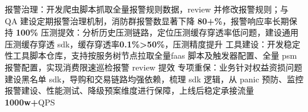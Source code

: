 \documentclass[11pt,a4paper]{moderncv}
\begin{document}
{\begin{itemize}
        \newline 报警治理：开发爬虫脚本抓取全量报警规则数据，review 并修改报警规则；与 QA 建设定期报警治理机制，消防群报警数显著下降 \textbf{80+\%}，报警响应率长期保持 \textbf{100\%}
        \newline 压测提效：分析历史压测链路，定位压测缓存穿透率低问题，建设通用压测缓存穿透 sdk，缓存穿透率\textbf{0.1\%\->50\%}，压测精度提升
        \newline 工具建设：开发稳定性工具脚本仓库，支持按服务树节点拉取全量faas 脚本及触发器配置、全量 psm 报警配置，实现消费限速巡检报警 review 提效
        \newline 专项重保：业务针对权益资损问题建设黑名单 sdk，导购和交易链路均强依赖，梳理 sdk 逻辑，从 panic 预防、监控报警建设、性能测试、降级预案维度进行保障，上线后稳定承接流量\textbf{1000w+}QPS
    \end{itemize}}

\end{document}
